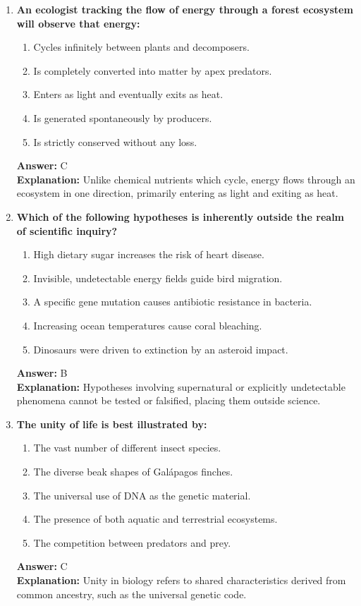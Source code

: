 \documentclass[11pt, a4paper]{article}
\begin{document}
\begin{enumerate}
\item \textbf{An ecologist tracking the flow of energy through a forest ecosystem will observe that energy:}
\begin{enumerate}[label=\Alph*.]
    \item Cycles infinitely between plants and decomposers.
    \item Is completely converted into matter by apex predators.
    \item Enters as light and eventually exits as heat.
    \item Is generated spontaneously by producers.
    \item Is strictly conserved without any loss.
\end{enumerate}
\textbf{Answer:} C \\
\textbf{Explanation:} Unlike chemical nutrients which cycle, energy flows through an ecosystem in one direction, primarily entering as light and exiting as heat.

\item \textbf{Which of the following hypotheses is inherently outside the realm of scientific inquiry?}
\begin{enumerate}[label=\Alph*.]
    \item High dietary sugar increases the risk of heart disease.
    \item Invisible, undetectable energy fields guide bird migration.
    \item A specific gene mutation causes antibiotic resistance in bacteria.
    \item Increasing ocean temperatures cause coral bleaching.
    \item Dinosaurs were driven to extinction by an asteroid impact.
\end{enumerate}
\textbf{Answer:} B \\
\textbf{Explanation:} Hypotheses involving supernatural or explicitly undetectable phenomena cannot be tested or falsified, placing them outside science.

\item \textbf{The unity of life is best illustrated by:}
\begin{enumerate}[label=\Alph*.]
    \item The vast number of different insect species.
    \item The diverse beak shapes of Galápagos finches.
    \item The universal use of DNA as the genetic material.
    \item The presence of both aquatic and terrestrial ecosystems.
    \item The competition between predators and prey.
\end{enumerate}
\textbf{Answer:} C \\
\textbf{Explanation:} Unity in biology refers to shared characteristics derived from common ancestry, such as the universal genetic code.


\end{enumerate}
\end{document}
